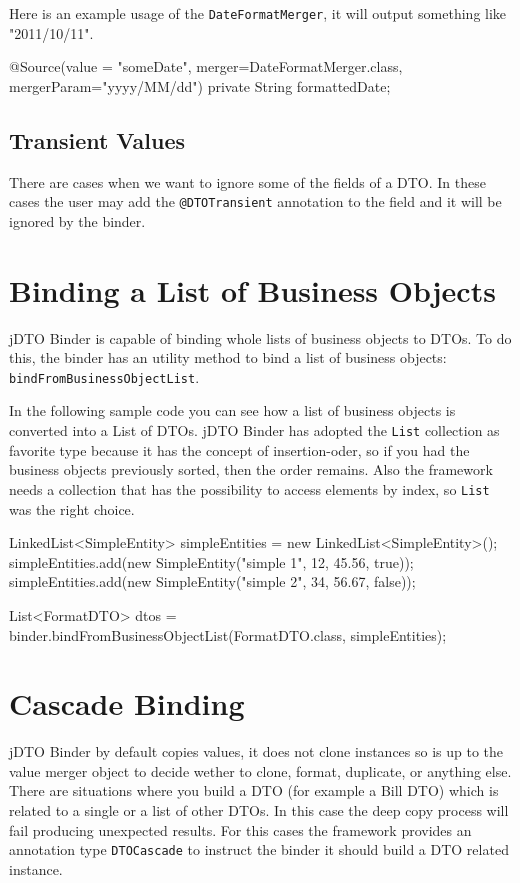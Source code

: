 \documentclass[11pt]{article}
\newcommand{\JDTO}{jDTO Binder\xspace}
\begin{document}
Here is an example usage of the \texttt{DateFormatMerger}, it will output something like "2011/10/11".


\begin{java}
@Source(value = "someDate", 
    merger=DateFormatMerger.class, mergerParam="yyyy/MM/dd")
private String formattedDate;
\end{java}

\subsection{Transient Values}


There are cases when we want to ignore some of the fields of a DTO. In these cases the user may add the \texttt{@DTOTransient} annotation to the field and it will be ignored by the binder.

\section{Binding a List of Business Objects}


\JDTO is capable of binding whole lists of business objects to DTOs. To do this, the binder has an utility method to bind a list of business objects: \texttt{bindFromBusinessObjectList}.

In the following sample code you can see how a list of business objects is converted into a List of DTOs. \JDTO has adopted the \texttt{List} collection as favorite type because it has the concept of insertion-oder, so if you had the business objects previously sorted, then the order remains. Also the framework needs a collection that has the possibility to access elements by index, so \texttt{List} was the right choice.


\begin{java}
LinkedList<SimpleEntity> simpleEntities = 
    new LinkedList<SimpleEntity>();
simpleEntities.add(new SimpleEntity("simple 1", 12, 45.56, true));
simpleEntities.add(new SimpleEntity("simple 2", 34, 56.67, false));

List<FormatDTO> dtos = binder.bindFromBusinessObjectList(FormatDTO.class, simpleEntities);
\end{java}


\section{Cascade Binding}


\JDTO by default copies values, it does not clone instances so is up to the value merger object to decide wether to clone, format, duplicate, or anything else. 
There are situations where you build a DTO (for example a Bill DTO) which is related to a single or a list of other DTOs. In this case the deep copy process will fail producing unexpected results. For this cases the framework provides an annotation type \texttt{DTOCascade} to instruct the binder it should build a DTO related instance.
\end{document}
